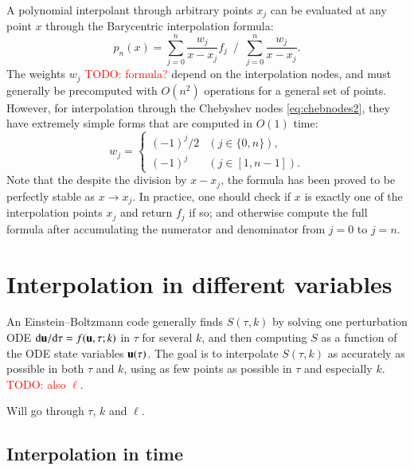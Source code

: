 \documentclass{aa}
\newcommand\EB{Einstein–Boltzmann}
\newcommand\boldu{{\bf u}}
\newcommand\TODO[1]{\textcolor{red}{TODO: #1}}
\begin{document}
A polynomial interpolant through arbitrary points $x_j$ can be evaluated at any point $x$ through the Barycentric interpolation formula:
\begin{equation}
	p_n(x) = \sum_{j=0}^n \frac{w_j}{x-x_j} f_j \,\,\,\Bigg/\,\,\, \sum_{j=0}^n \frac{w_j}{x-x_j}.
\end{equation}
The weights $w_j$ \TODO{formula?} depend on the interpolation nodes, and must generally be precomputed with $O(n^2)$ operations for a general set of points.
However, for interpolation through the Chebyshev nodes \eqref{eq:chebnodes2}, they have extremely simple forms that are computed in $O(1)$ time:
\begin{equation}
	w_j = \begin{cases} (-1)^j/2 & (j \in \{0,n\}), \\ (-1)^j & (j \in [1,n-1]). \end{cases}
\end{equation}
Note that the despite the division by $x-x_j$, the formula has been proved to be perfectly stable as $x \rightarrow x_j$.
In practice, one should check if $x$ is exactly one of the interpolation points $x_j$ and return $f_j$ if so; and otherwise compute the full formula after accumulating the numerator and denominator from $j=0$ to $j=n$.

\section{Interpolation in different variables}

An \EB{} code generally finds $S(\tau, k)$ by solving one perturbation ODE $\mathrm{d}\boldu/\mathrm{d}\tau = f(\boldu, \tau; k)$ in $\tau$ for several $k$, and then computing $S$ as a function of the ODE state variables $\boldu(\tau)$.
The goal is to interpolate $S(\tau, k)$ as accurately as possible in both $\tau$ and $k$, using as few points as possible in $\tau$ and especially $k$.
\TODO{also $\ell$}.

Will go through $\tau$, $k$ and $\ell$.

\subsection{Interpolation in time}
\end{document}

